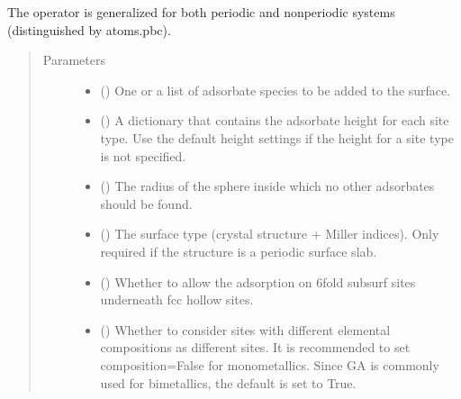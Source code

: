 \documentclass[letterpaper,10pt,english]{sphinxmanual}
\begin{document}
\begin{fulllineitems}
The operator is generalized for both periodic and non\sphinxhyphen{}periodic systems
(distinguished by atoms.pbc).
\begin{quote}\begin{description}
\item[{Parameters}] \leavevmode\begin{itemize}
\item {} 
 () \textendash{} One or a list of adsorbate species to be added to the surface.

\item {} 
 (\sphinxstyleliteralemphasis{\sphinxupquote{, }}) \textendash{} A dictionary that contains the adsorbate height for each site
type. Use the default height settings if the height for a site
type is not specified.

\item {} 
 (\sphinxstyleliteralemphasis{\sphinxupquote{, }}) \textendash{} The radius of the sphere inside which no other adsorbates
should be found.

\item {} 
 (\sphinxstyleliteralemphasis{\sphinxupquote{, }}) \textendash{} The surface type (crystal structure + Miller indices).
Only required if the structure is a periodic surface slab.

\item {} 
 (\sphinxstyleliteralemphasis{\sphinxupquote{, }}) \textendash{} Whether to allow the adsorption on 6\sphinxhyphen{}fold subsurf sites
underneath fcc hollow sites.

\item {} 
 (\sphinxstyleliteralemphasis{\sphinxupquote{, }}) \textendash{} Whether to consider sites with different elemental compositions
as different sites. It is recommended to set composition=False
for monometallics. Since GA is commonly used for bimetallics,
the default is set to True.


\end{itemize}
\end{description}
\end{quote}
\end{fulllineitems}
\end{document}
